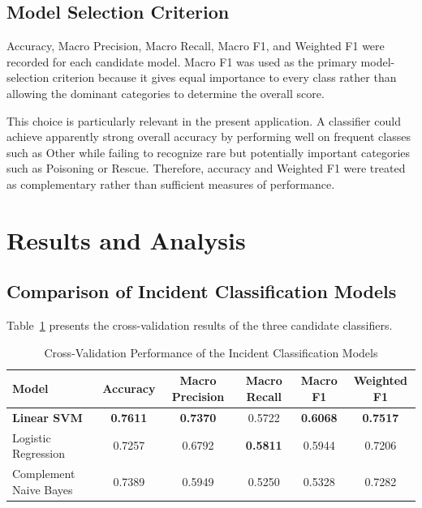 \documentclass[conference]{IEEEtran}
\begin{document}
\subsection{Model Selection Criterion}

Accuracy, Macro Precision, Macro Recall, Macro F1, and Weighted F1 were
recorded for each candidate model. Macro F1 was used as the primary
model-selection criterion because it gives equal importance to every class
rather than allowing the dominant categories to determine the overall score.

This choice is particularly relevant in the present application. A classifier
could achieve apparently strong overall accuracy by performing well on
frequent classes such as Other while failing to recognize rare but potentially
important categories such as Poisoning or Rescue. Therefore, accuracy and
Weighted F1 were treated as complementary rather than sufficient measures of
performance.


\section{Results and Analysis}

\subsection{Comparison of Incident Classification Models}

Table~\ref{tab:model_comparison} presents the cross-validation results of the
three candidate classifiers.

\begin{table}[!t]
\centering
\caption{Cross-Validation Performance of the Incident Classification Models}
\label{tab:model_comparison}
\renewcommand{\arraystretch}{1.18}
\setlength{\tabcolsep}{9pt}
\begin{tabular}{lccccc}
\toprule
\textbf{Model} &
\textbf{Accuracy} &
\textbf{Macro Precision} &
\textbf{Macro Recall} &
\textbf{Macro F1} &
\textbf{Weighted F1} \\
\midrule
\textbf{Linear SVM} &
\textbf{0.7611} &
\textbf{0.7370} &
0.5722 &
\textbf{0.6068} &
\textbf{0.7517} \\

Logistic Regression &
0.7257 &
0.6792 &
\textbf{0.5811} &
0.5944 &
0.7206 \\

Complement Naive Bayes &
0.7389 &
0.5949 &
0.5250 &
0.5328 &
0.7282 \\
\bottomrule
\end{tabular}
\end{table}
\end{document}
